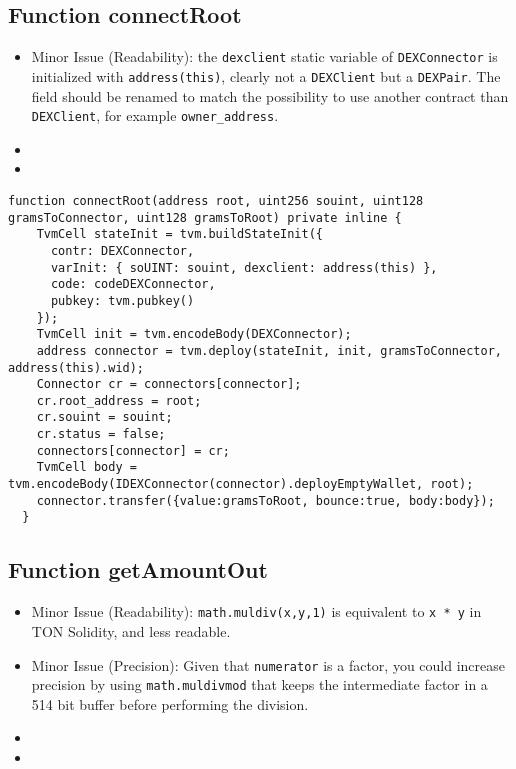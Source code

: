 \subsection{Function connectRoot}

\begin{itemize}
\item Minor Issue (Readability): the {\tt dexclient} static variable
  of {\tt DEXConnector} is initialized with {\tt address(this)},
  clearly not a {\tt DEXClient} but a {\tt DEXPair}. The field should
  be renamed to match the possibility to use another contract than
  {\tt DEXClient}, for example {\tt owner\_address}.
\item \issueEncodeBody
\item \issueInternal
\end{itemize}

\begin{lstlisting}[firstnumber=113]
  function connectRoot(address root, uint256 souint, uint128 gramsToConnector, uint128 gramsToRoot) private inline {
    TvmCell stateInit = tvm.buildStateInit({
      contr: DEXConnector,
      varInit: { soUINT: souint, dexclient: address(this) },
      code: codeDEXConnector,
      pubkey: tvm.pubkey()
    });
    TvmCell init = tvm.encodeBody(DEXConnector);
    address connector = tvm.deploy(stateInit, init, gramsToConnector, address(this).wid);
    Connector cr = connectors[connector];
    cr.root_address = root;
    cr.souint = souint;
    cr.status = false;
    connectors[connector] = cr;
    TvmCell body = tvm.encodeBody(IDEXConnector(connector).deployEmptyWallet, root);
    connector.transfer({value:gramsToRoot, bounce:true, body:body});
  }
\end{lstlisting}

\subsection{Function getAmountOut}

\begin{itemize}
\item Minor Issue (Readability): {\tt math.muldiv(x,y,1)} is
  equivalent to {\tt x * y} in TON Solidity, and less readable.
\item Minor Issue (Precision): Given that {\tt numerator} is a factor,
  you could increase precision by using {\tt math.muldivmod} that
  keeps the intermediate factor in a 514 bit buffer before performing
  the division.
\item \issueError{}
\item \issueInternal{}
\end{itemize}


